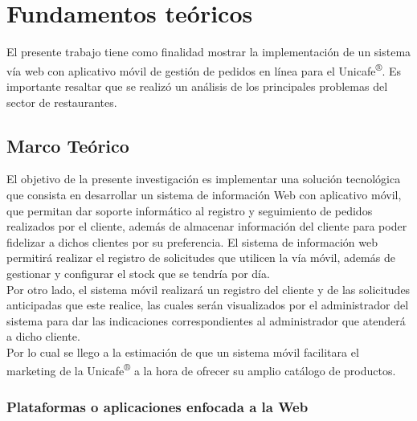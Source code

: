 \chapter{Fundamentos teóricos} \label{Capitulo: Fundamentos}

\begin{large}
\onehalfspacing %
El presente trabajo tiene como finalidad mostrar la implementación de un sistema vía web con aplicativo móvil de gestión de pedidos en línea para el Unicafe\textsuperscript{®}. Es importante resaltar que se realizó un análisis de los principales problemas del sector de restaurantes.

\section{Marco Teórico}

El objetivo de la presente investigación es implementar una solución tecnológica que consista en desarrollar un sistema de información Web con aplicativo móvil, que permitan dar soporte informático al registro y seguimiento de pedidos realizados por el cliente, además de almacenar información del cliente para poder fidelizar a dichos clientes por su preferencia. El sistema de información web permitirá realizar el registro de solicitudes que utilicen la vía móvil, además de gestionar y configurar el stock que se tendría por día.
\\
Por otro lado, el sistema móvil realizará un registro del cliente y de las solicitudes anticipadas que este realice, las cuales serán visualizados por el administrador del sistema para dar las indicaciones correspondientes al administrador que atenderá a dicho cliente.
\\
Por lo cual se llego a la estimación de que un sistema móvil facilitara el marketing de la Unicafe\textsuperscript{®} a la hora de ofrecer su amplio catálogo de productos.

\subsection{Plataformas o aplicaciones enfocada a la Web}


\end{large}
